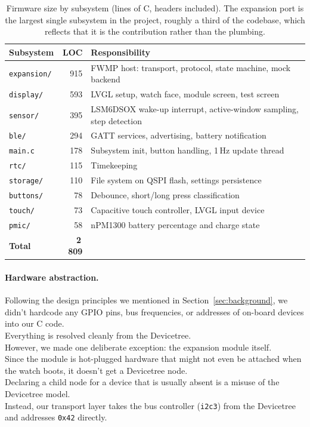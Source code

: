 \documentclass[12pt, a4paper]{article}
\begin{document}
\begin{table}[H]
\centering
\small
\begin{tabular}{@{}l r p{8.4cm}@{}}
\toprule
\textbf{Subsystem} & \textbf{LOC} & \textbf{Responsibility} \\
\midrule
\texttt{expansion/} & 915 & FWMP host: transport, protocol, state machine, mock backend \\
\texttt{display/}   & 593 & LVGL setup, watch face, module screen, test screen \\
\texttt{sensor/}    & 395 & LSM6DSOX wake-up interrupt, active-window sampling, step detection \\
\texttt{ble/}       & 294 & GATT services, advertising, battery notification \\
\texttt{main.c}     & 178 & Subsystem init, button handling, 1\,Hz update thread \\
\texttt{rtc/}       & 115 & Timekeeping \\
\texttt{storage/}   & 110 & File system on QSPI flash, settings persistence \\
\texttt{buttons/}   & 78  & Debounce, short/long press classification \\
\texttt{touch/}     & 73  & Capacitive touch controller, LVGL input device \\
\texttt{pmic/}      & 58  & nPM1300 battery percentage and charge state \\
\midrule
\textbf{Total}      & \textbf{2\,809} & \\
\bottomrule
\end{tabular}
\caption{Firmware size by subsystem (lines of C, headers included). The expansion port is the largest single subsystem in the project, roughly a third of the codebase, which reflects that it is the contribution rather than the plumbing.}
\label{tab:loc}
\end{table}

\paragraph{Hardware abstraction.} Following the design principles we mentioned in Section~\ref{sec:background}, we didn't hardcode any GPIO pins, bus frequencies, or  addresses of on-board devices into our C code. \\
Everything is resolved cleanly from the Devicetree. \\
However, we made one deliberate exception: the expansion module itself. \\
Since the module is hot-plugged hardware that might not even be attached when the watch boots, it doesn't get a Devicetree node. \\
Declaring a child node for a device that is usually absent is a misuse of the Devicetree model. \\
Instead, our transport layer takes the  bus controller (\texttt{i2c3}) from the Devicetree and addresses \texttt{0x42} directly.
\end{document}

